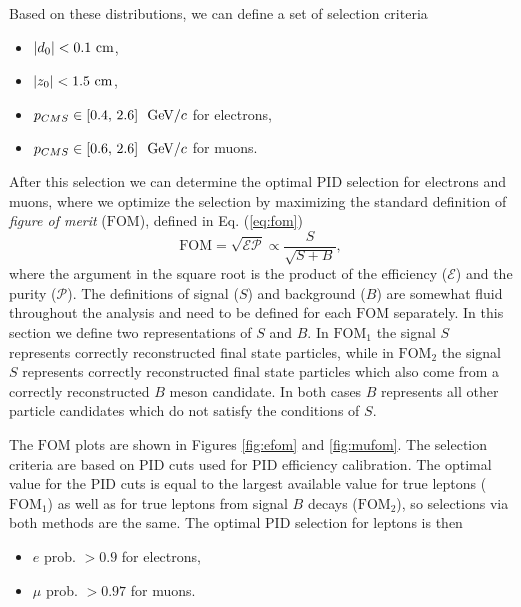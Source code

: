 Based on these distributions, we can define a set of selection criteria
\begin{itemize}
	\item $\vert d_0 \vert < 0.1\mathrm{~cm}$,
	\item $\vert z_0 \vert < 1.5\mathrm{~cm}$,
	\item $p_{CMS} \in [0.4,\,2.6]~\mathrm{~GeV}/c$ for electrons,
	\item $p_{CMS} \in [0.6,\,2.6]~\mathrm{~GeV}/c$ for muons.
\end{itemize}

After this selection we can determine the optimal PID selection for electrons and muons, where we optimize the selection by maximizing the standard definition of \textit{figure of merit} ($\mathrm{FOM}$), defined in Eq. (\ref{eq:fom})
\begin{equation}
\label{eq:fom}
\mathrm{FOM} = \sqrt{\mathcal{E}\mathcal{P}} \propto \frac{S}{\sqrt{S+B}},
\end{equation} 
where the argument in the square root is the product of the efficiency ($\mathcal{E}$) and the purity ($\mathcal{P}$). The definitions of signal ($S$) and background ($B$) are somewhat fluid throughout the analysis and need to be defined for each $\mathrm{FOM}$ separately. In this section we define two representations of $S$ and $B$. In $\mathrm{FOM}_1$ the signal $S$ represents correctly reconstructed final state particles, while in $\mathrm{FOM}_2$ the signal $S$ represents correctly reconstructed final state particles which also come from a correctly reconstructed $B$ meson candidate. In both cases $B$ represents all other particle candidates which do not satisfy the conditions of $S$.

The $\mathrm{FOM}$ plots are shown in Figures \ref{fig:efom} and \ref{fig:mufom}. The selection criteria are based on PID cuts used for PID efficiency calibration. The optimal value for the PID cuts is equal to the largest available value for true leptons ($\mathrm{FOM}_1$) as well as for true leptons from signal $B$ decays ($\mathrm{FOM}_2$), so selections via both methods are the same. The optimal PID selection for leptons is then
\begin{itemize}
	\item $e$ prob. $ > 0.9$ for electrons,
	\item $\mu$ prob. $ > 0.97$ for muons.
\end{itemize}

